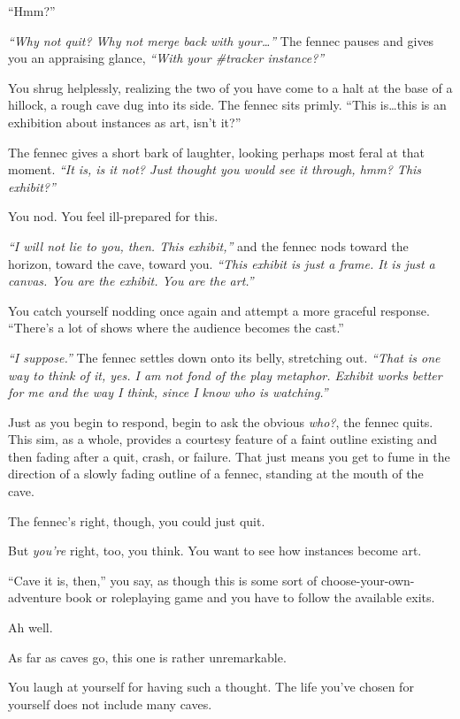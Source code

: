 ``Hmm?''

\emph{``Why not quit? Why not merge back with your\ldots{}''} The fennec pauses and gives you an appraising glance, \emph{``With your \#tracker instance?''}

You shrug helplessly, realizing the two of you have come to a halt at the base of a hillock, a rough cave dug into its side. The fennec sits primly. ``This is\ldots{}this is an exhibition about instances as art, isn't it?''

The fennec gives a short bark of laughter, looking perhaps most feral at that moment. \emph{``It is, is it not? Just thought you would see it through, hmm? This exhibit?''}

You nod. You feel ill-prepared for this.

\emph{``I will not lie to you, then. This exhibit,''} and the fennec nods toward the horizon, toward the cave, toward you. \emph{``This exhibit is just a frame. It is just a canvas. You are the exhibit. You are the art.''}

You catch yourself nodding once again and attempt a more graceful response. ``There's a lot of shows where the audience becomes the cast.''

\emph{``I suppose.''} The fennec settles down onto its belly, stretching out. \emph{``That is one way to think of it, yes. I am not fond of the play metaphor. Exhibit works better for me and the way I think, since I know who is watching.''}

Just as you begin to respond, begin to ask the obvious \emph{who?}, the fennec quits. This sim, as a whole, provides a courtesy feature of a faint outline existing and then fading after a quit, crash, or failure. That just means you get to fume in the direction of a slowly fading outline of a fennec, standing at the mouth of the cave.

The fennec's right, though, you could just quit.

But \emph{you're} right, too, you think. You want to see how instances become art.

``Cave it is, then,'' you say, as though this is some sort of choose-your-own-adventure book or roleplaying game and you have to follow the available exits.

Ah well.

\newpage
\null
\vfill

As far as caves go, this one is rather unremarkable.

You laugh at yourself for having such a thought. The life you've chosen for yourself does not include many caves.

